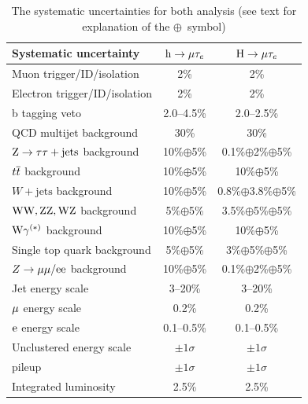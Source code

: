 \begin{table}[htpb]
  \begin{center}
    \caption{The systematic uncertainties for both analysis
      (see text for explanation of the $\oplus$~symbol)}
\begin{tabular}{l*{2}{c}} \hline
Systematic  uncertainty            & $\text{h} \to \mu \tau_{e}$& $\text{H} \to \mu \tau_{e}$  \\ \hline
Muon  trigger/ID/isolation         &          2\%           &        2\%         \\
Electron trigger/ID/isolation      &          2\%           &        2\%           \\
b tagging veto                     &      2.0--4.5\%        &      2.0--2.5\%         \\ 
[\cmsTabSkip]
QCD multijet background            &          30\%          &        30\%                \\
$\text{Z} \to \tau \tau+\textrm{jets}$ background    &    10\%$\oplus$5\%     & 0.1\%$\oplus$2\%$\oplus$5\%         \\
$t\overline{t}$ background                  &    10\%$\oplus$5\%     &   10\%$\oplus$5\%              \\
$W+\textrm{jets}$ background       &    10\%$\oplus$5\%     & 0.8\%$\oplus$3.8\%$\oplus$5\%        \\
$\text{W}\text{W},\text{Z}\text{Z},\text{W}\text{Z}$ background  &    5\%$\oplus$5\%      &  3.5\%$\oplus$5\%$\oplus$5\%       \\
$\text{W}\gamma^{(*)}$ background       &    10\%$\oplus$5\%     &  10\%$\oplus$5\%       \\
Single top quark background        &    5\%$\oplus$5\%      & 3\%$\oplus$5\%$\oplus$5\%    \\ 
$Z\to\mu\mu/\text{e}\text{e}$ background   &    10\%$\oplus$5\%     & 0.1\%$\oplus$2\%$\oplus$5\%     \\
[\cmsTabSkip]
Jet energy scale                   &        3--20\%         &        3--20\%                         \\
$\mu$ energy scale                &        0.2\%           &        0.2\%                              \\
 $\text{e}$ energy scale                &        0.1--0.5\%      &        0.1--0.5\%                          \\
Unclustered energy scale           &        $\pm 1 \sigma$  &     $\pm 1 \sigma$                            \\
pileup                             &        $\pm 1 \sigma$  &     $\pm 1 \sigma$                            \\
[\cmsTabSkip]
Integrated luminosity              &         2.5\%          &       2.5\%                                        \\ \hline
\end{tabular}
\label{table:syst}
\end{center}
\end{table}


